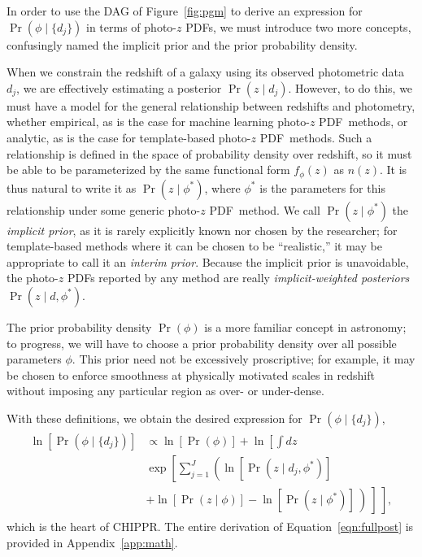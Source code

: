 \documentclass[iop]{emulateapj}
\newcommand{\chippr}{CHIPPR}
\newcommand{\nz}{$n(z)$}
\newcommand{\pzpdf}{photo-$z$ PDF}
\begin{document}
In order to use the DAG of Figure~\ref{fig:pgm} to derive an expression for $\Pr(\phi \mid \{d_{j}\})$ in terms of \pzpdf s, we must introduce two more concepts, confusingly named the implicit prior and the prior probability density.

When we constrain the redshift of a galaxy using its observed photometric data $d_{j}$, we are effectively estimating a posterior $\Pr(z \mid d_{j})$.
However, to do this, we must have a model for the general relationship between redshifts and photometry, whether empirical, as is the case for machine learning \pzpdf\ methods, or analytic, as is the case for template-based \pzpdf\ methods.
Such a relationship is defined in the space of probability density over redshift, so it must be able to be parameterized by the same functional form $f_{\phi}(z)$ as \nz .
It is thus natural to write it as $\Pr(z \mid \phi^{*})$, where $\phi^{*}$ is the parameters for this relationship under some generic \pzpdf\ method.
We call $\Pr(z \mid \phi^{*})$ the \textit{implicit prior}, as it is rarely explicitly known nor chosen by the researcher; for template-based methods where it can be chosen to be ``realistic,'' it may be appropriate to call it an \textit{interim prior}.
Because the implicit prior is unavoidable, the \pzpdf s reported by any method are really \textit{implicit-weighted posteriors} $\Pr(z \mid d, \phi^{*})$.

The prior probability density $\Pr(\phi)$ is a more familiar concept in astronomy; to progress, we will have to choose a prior probability density over all possible parameters $\phi$.
This prior need not be excessively proscriptive; for example, it may be chosen to enforce smoothness at physically motivated scales in redshift without imposing any particular region as over- or under-dense.

With these definitions, we obtain the desired expression for $\Pr(\phi \mid 
\{d_{j}\})$,
\begin{align}
\begin{split}
  \label{eqn:fullpost}
  \ln[\Pr(\phi \mid \{d_{j}\})] & \propto \ln[\Pr(\phi)] + \ln \left[\int dz 
\right.\\
  & \left. \exp \left[\sum_{j=1}^{J} \left(\ln[\Pr(z \mid d_{j}, \phi^{*})] 
\right. \right. \right.\\
  & \left. \left. \left. + \ln[\Pr(z \mid \phi)] - \ln[\Pr(z \mid \phi^{*})]\ 
\right)\ \right]\ \right] ,
\end{split}
\end{align}
which is the heart of \chippr.
The entire derivation of Equation~\ref{eqn:fullpost} is provided in Appendix~\ref{app:math}.
\end{document}
